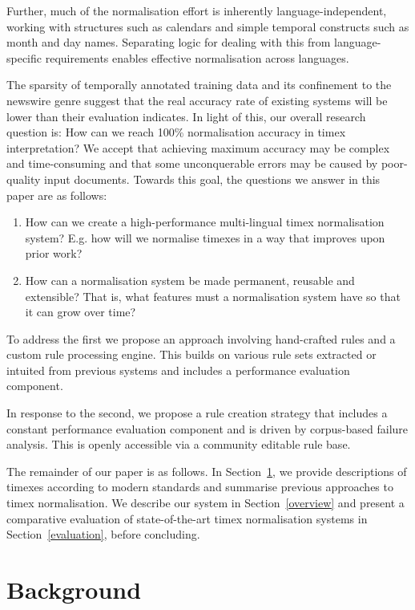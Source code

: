 \documentclass[10pt, a4paper]{article}
\begin{document}
Further, much of the normalisation effort is inherently language-independent, working with structures such as calendars and simple temporal constructs such as month and day names. Separating logic for dealing with this from language-specific requirements enables effective normalisation across languages.

The sparsity of temporally annotated training data and its confinement to the newswire genre suggest that the real accuracy rate of existing systems will be lower than their evaluation indicates.
In light of this, our overall research question is: How can we reach 100\% normalisation accuracy in timex interpretation? We accept that achieving maximum accuracy may be complex and time-consuming and that some unconquerable errors may be caused by poor-quality input documents. Towards this goal, the questions we answer in this paper are as follows:

\begin{enumerate}
\item How can we create a high-performance multi-lingual timex normalisation system? E.g. how will we normalise timexes in a way that improves upon prior work?
\item How can a normalisation system be made permanent, reusable and extensible? That is, what features must a normalisation system have so that it can grow over time? 
\end{enumerate} 

To address the first we propose an approach involving hand-crafted rules and a custom rule processing engine. This builds on various rule sets extracted or intuited from previous systems and includes a performance evaluation component. 

In response to the second, we propose a rule creation strategy that includes a constant performance evaluation component and is driven by corpus-based failure analysis. This is openly accessible via a community editable rule base. 

The remainder of our paper is as follows. In Section~\ref{background}, we provide descriptions of timexes according to modern standards and summarise previous approaches to timex normalisation. We describe our system in Section~\ref{overview} and present a comparative evaluation of state-of-the-art timex normalisation systems in Section~\ref{evaluation}, before concluding.


\section{Background}
\label{background}
\end{document}
